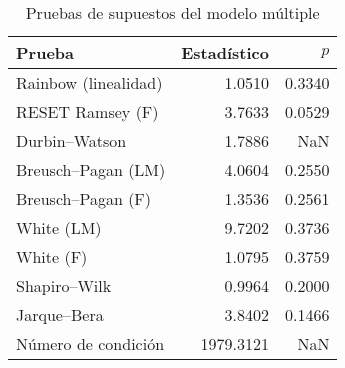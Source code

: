 \begin{table}
\caption{Pruebas de supuestos del modelo múltiple}
\label{tab:ols_multiple_assumption_tests}
\begin{tabular}{lrr}
\toprule
Prueba & Estadístico & $p$ \\
\midrule
Rainbow (linealidad) & 1.0510 & 0.3340 \\
RESET Ramsey (F) & 3.7633 & 0.0529 \\
Durbin–Watson & 1.7886 & NaN \\
Breusch–Pagan (LM) & 4.0604 & 0.2550 \\
Breusch–Pagan (F) & 1.3536 & 0.2561 \\
White (LM) & 9.7202 & 0.3736 \\
White (F) & 1.0795 & 0.3759 \\
Shapiro–Wilk & 0.9964 & 0.2000 \\
Jarque–Bera & 3.8402 & 0.1466 \\
Número de condición & 1979.3121 & NaN \\
\bottomrule
\end{tabular}
\end{table}
